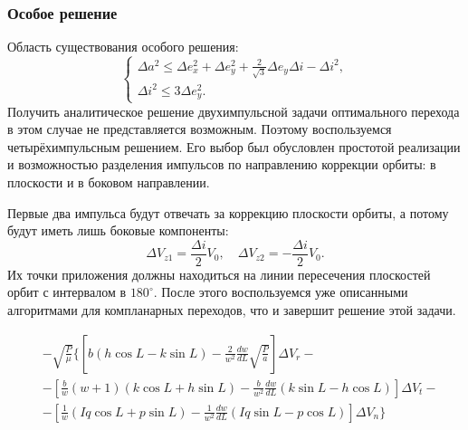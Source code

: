 \documentclass[12pt,a4paper]{extarticle}
\begin{document}
\subsubsection{Особое решение}
Область существования особого решения:
\begin{equation}
\begin{cases}
    \Delta a^2 \leq \Delta e_x^2 + \Delta e_y^2 + \frac{2}{\sqrt{3}} \Delta e_y \Delta i - \Delta i^2, \\
    \Delta i^2 \leq 3\Delta e_y^2.
\end{cases}
\end{equation}
Получить аналитическое решение двухимпульсной задачи оптимального перехода в этом случае не представляется возможным. Поэтому воспользуемся четырёхимпульсным решением. Его выбор был обусловлен простотой реализации и возможностью разделения импульсов по направлению коррекции орбиты: в плоскости и в боковом направлении.

Первые два импульса будут отвечать за коррекцию плоскости орбиты, а потому будут иметь лишь боковые компоненты:
\begin{equation}
    \Delta V_{z1} = \frac{\Delta i}{2} V_0, \quad \Delta V_{z2} = - \frac{\Delta i}{2} V_0.
\end{equation}
Их точки приложения должны находиться на линии пересечения плоскостей орбит с интервалом в $180^{\circ}$. После этого воспользуемся уже описанными алгоритмами для компланарных переходов, что и завершит решение этой задачи.

\newpage

\begin{align*}
    &-\sqrt{\frac{P}{\mu}} \{ \left[ b (h \cos L - k \sin L) - \frac{2}{w^2} \frac{dw}{dL} \sqrt{\frac{P}{a}} \right] \Delta V_r - \\
    & - \left[ \frac{b}{w} (w + 1) (k \cos L + h \sin L) -
    \frac{b}{w^2} \frac{dw}{dL} (k \sin L - h \cos L) \right] \Delta V_t - \\
    & - \left[ \frac{1}{w} (Iq \cos L + p \sin L) - \frac{1}{w^2} \frac{dw}{dL} (Iq \sin L - p \cos L) \right] \Delta V_n \}
\end{align*}

\newpage
\end{document}

